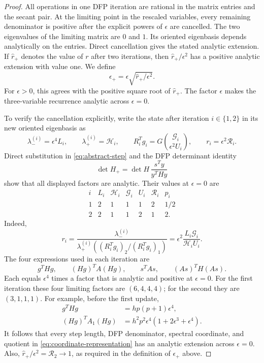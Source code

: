 \documentclass[11pt]{article}
\begin{document}
\begin{proof}
All operations in one DFP iteration are rational in the matrix entries and the
secant pair.  At the limiting point in the rescaled variables, every remaining
denominator is positive after the explicit powers of $\epsilon$ are cancelled.
The two eigenvalues of the limiting matrix are $0$ and $1$.  Its oriented
eigenbasis depends analytically on the entries.  Direct cancellation
gives the stated analytic extension.  If $\widehat r_+$ denotes the value of
$r$ after two
iterations, then $\widehat r_+/\epsilon^2$ has a positive analytic extension
with value one.  We define
\[
\epsilon_+=\epsilon
\sqrt{\widehat r_+/\epsilon^2}.
\]
For $\epsilon>0$, this agrees with the positive square root of
$\widehat r_+$.  The factor $\epsilon$ makes the three-variable recurrence
analytic across $\epsilon=0$.

To verify the cancellation explicitly, write the state after iteration
$i\in\{1,2\}$ in its new oriented eigenbasis as
\[
\lambda_-^{(i)}=\epsilon^4L_i,\qquad
\lambda_+^{(i)}=\mathcal H_i,\qquad
R_i^Tg_i
=G\binom{\mathcal G_i}{\epsilon^2U_i},\qquad
r_i=\epsilon^2\mathcal R_i.
\]
Direct substitution in \eqref{eq:abstract-step} and the DFP determinant
identity
\[
\det H_+=\det H\,\frac{s^Ty}{y^THy}
\]
show that all displayed factors are analytic.  Their values at
$\epsilon=0$ are
\[
\begin{array}{c|cccccc}
i&L_i&\mathcal H_i&\mathcal G_i&U_i&\mathcal R_i&p_i\\ \hline
1&2&1&1&1&2&1/2\\
2&2&1&1&2&1&2.
\end{array}
\]
Indeed,
\[
r_i=\frac{\lambda_-^{(i)}}
{\lambda_+^{(i)}
 ((R_i^Tg_i)_2/(R_i^Tg_i)_1)}
=\epsilon^2\frac{L_i\mathcal G_i}{\mathcal H_iU_i}.
\]
The four expressions used in each iteration are
\[
g^THg,\qquad (Hg)^TA(Hg),\qquad s^TAs,\qquad (As)^TH(As).
\]
Each equals $\epsilon^4$ times a factor that is analytic and positive at
$\epsilon=0$.
For the first iteration these four limiting factors are $(6,4,4,4)$; for the
second they are $(3,1,1,1)$.  For example, before the first update,
\begin{align*}
g^THg&=hp(p+1)\epsilon^4,\\
(Hg)^TA_1(Hg)&=h^2p^2\epsilon^4
 (1+2\epsilon^3+\epsilon^4).
\end{align*}
It follows that every step length, DFP denominator, spectral coordinate, and
quotient in \eqref{eq:coordinate-representation} has an analytic extension
across $\epsilon=0$.  Also,
$\widehat r_+/\epsilon^2=\mathcal R_2\to1$, as required in the definition of
$\epsilon_+$ above.


\end{proof}
\end{document}
